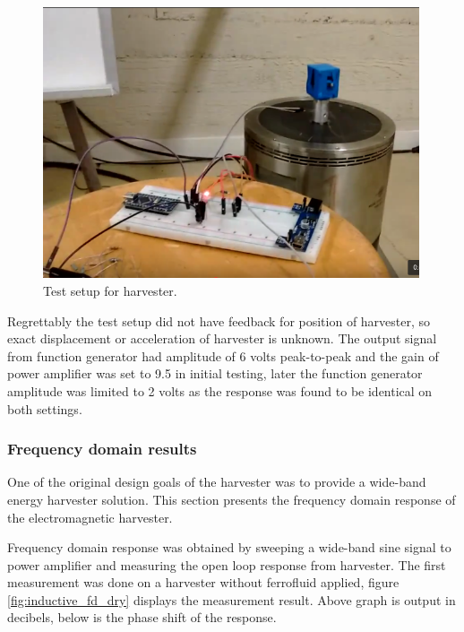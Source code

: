 \begin{figure}[htb]
\begin{center}
\includegraphics[height=8cm]{images/own_pic/shaker_setup/emh_shaker.png}
\end{center}
\caption{\label{fig:emh_shaker} Test setup for harvester.}
\end{figure}

Regrettably the test setup did not have feedback for position of harvester, so exact displacement or acceleration of harvester is unknown. The output signal from function generator had amplitude of 6 volts peak-to-peak and the gain of power amplifier was set to 9.5 in initial testing, later the function generator amplitude was limited to 2 volts as the response was found to be identical on both settings.

\subsubsection{Frequency domain results} \label{sect:emh_fd}
One of the original design goals of the harvester was to provide a wide-band energy harvester solution. This section presents the frequency domain response of the electromagnetic harvester.

Frequency domain response was obtained by sweeping a wide-band sine signal to power amplifier and measuring the open loop response from harvester. The first measurement was done on a harvester without ferrofluid applied, figure \ref{fig:inductive_fd_dry} displays the measurement result. Above graph is output in decibels, below is the phase shift of the response.


